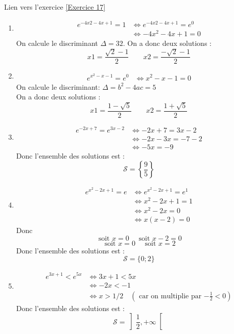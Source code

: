 \documentclass[12pt,fleqn]{report} %
\begin{document}
\begin{correction}Lien vers l'exercice   \ref{Exercice 17}
	\begin{enumerate}
		\item 
		\begin{align*}
		e^{-4x2-4x+1} =1 & \iff e^{-4x2-4x+1} =e^0\\
		& \iff -4x^2-4x+1 =0
		\end{align*}
		{On calcule le discriminant}  $\Delta = 32$. On a donc deux solutions : 
		\[x1= \frac{\sqrt2-1}{2} \qquad x2= \frac{-\sqrt2-1}{2} 
		\]
		\item 
		\begin{align*}
		e^{x^2-x-1} =e^0 & \iff 
		x^2-x-1 =0
		\end{align*}
		On calcule le discriminant: $\Delta = b^2-4ac=5$ \\
		On a donc deux solutions :\[
		x1= \frac{1-\sqrt5}{2} \qquad 	x2=\frac{1+\sqrt5}{2}\] 
		\item 
		\begin{align*}
		e^{-2x+7} =e^{3x-2} & \iff 	-2x+7 =3x-2\\
		& \iff -2x-3x =-7-2\\
		& \iff -5x =-9
		\end{align*}
		Donc l'ensemble des solutions est :\[
		\mathcal{S}= \left\lbrace\frac{9}{5}\right\rbrace
		\]
		
		\item 
		\begin{align*}
		e^{x^2-2x+1} =e & \iff 	e^{x^2-2x+1} =e^1\\
		& \iff x^2-2x+1 =1\\
		& \iff x^2-2x =0\\
		& \iff x(x-2) =0
		\end{align*}
		Donc \[
		\text{ soit } x = 0 \quad \text{ soit } x - 2 = 0
		\]
		\[
		\text{ soit } x = 0 \quad \text{ soit } x = 2
		\]
		Donc l'ensemble des solutions est : 
		\[
		\mathcal{S} = \lbrace 0;2 \rbrace
		\]
		
		\item 
		\begin{align*}
		e^{3x+1}  <e^{5x} & \iff 3x+1 <5x\\
		& \iff -2x <-1\\
		& \iff x  >1/2 \quad \left(\text{ car on multiplie par $-\frac{1}{2} < 0$}\right)
		\end{align*}
		Donc l'ensemble des solutions est :
		\[
		\mathcal{S}= \left]\frac{1}{2},+\infty\right[
		\]
	\end{enumerate}
\end{correction}
\end{document}
